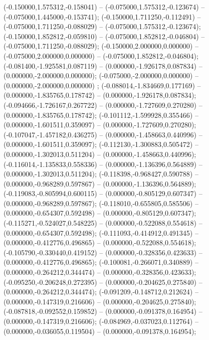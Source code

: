  (-0.150000,1.575312,-0.158041) -- (-0.075000,1.575312,-0.123674) -- (-0.075000,1.445000,-0.153741);
 (-0.150000,1.711250,-0.112491) -- (-0.075000,1.711250,-0.088029) -- (-0.075000,1.575312,-0.123674);
 (-0.150000,1.852812,-0.059810) -- (-0.075000,1.852812,-0.046804) -- (-0.075000,1.711250,-0.088029);
 (-0.150000,2.000000,0.000000) -- (-0.075000,2.000000,0.000000) -- (-0.075000,1.852812,-0.046804);
 (-0.081400,-1.925581,0.087119) -- (0.000000,-1.926178,0.087834) -- (0.000000,-2.000000,0.000000);
 (-0.075000,-2.000000,0.000000) -- (0.000000,-2.000000,0.000000) ;
 (-0.088014,-1.834669,0.177169) -- (0.000000,-1.835765,0.178742) -- (0.000000,-1.926178,0.087834);
 (-0.094666,-1.726167,0.267722) -- (0.000000,-1.727609,0.270280) -- (0.000000,-1.835765,0.178742);
 (-0.101112,-1.599928,0.355466) -- (0.000000,-1.601511,0.359097) -- (0.000000,-1.727609,0.270280);
 (-0.107047,-1.457182,0.436275) -- (0.000000,-1.458663,0.440996) -- (0.000000,-1.601511,0.359097);
 (-0.112130,-1.300883,0.505472) -- (0.000000,-1.302013,0.511204) -- (0.000000,-1.458663,0.440996);
 (-0.116014,-1.135833,0.558336) -- (0.000000,-1.136396,0.564889) -- (0.000000,-1.302013,0.511204);
 (-0.118398,-0.968427,0.590788) -- (0.000000,-0.968289,0.597867) -- (0.000000,-1.136396,0.564889);
 (-0.119083,-0.805994,0.600115) -- (0.000000,-0.805129,0.607347) -- (0.000000,-0.968289,0.597867);
 (-0.118010,-0.655805,0.585506) -- (0.000000,-0.654307,0.592498) -- (0.000000,-0.805129,0.607347);
 (-0.115271,-0.524027,0.548225) -- (0.000000,-0.522088,0.554618) -- (0.000000,-0.654307,0.592498);
 (-0.111093,-0.414912,0.491345) -- (0.000000,-0.412776,0.496865) -- (0.000000,-0.522088,0.554618);
 (-0.105790,-0.330440,0.419152) -- (0.000000,-0.328356,0.423633) -- (0.000000,-0.412776,0.496865);
 (-0.100081,-0.266071,0.340889) -- (0.000000,-0.264212,0.344474) -- (0.000000,-0.328356,0.423633);
 (-0.095250,-0.206248,0.272395) -- (0.000000,-0.204625,0.275840) -- (0.000000,-0.264212,0.344474);
 (-0.091209,-0.148712,0.212624) -- (0.000000,-0.147319,0.216606) -- (0.000000,-0.204625,0.275840);
 (-0.087818,-0.092552,0.159852) -- (0.000000,-0.091378,0.164954) -- (0.000000,-0.147319,0.216606);
 (-0.084969,-0.037023,0.112764) -- (0.000000,-0.036055,0.119504) -- (0.000000,-0.091378,0.164954);
